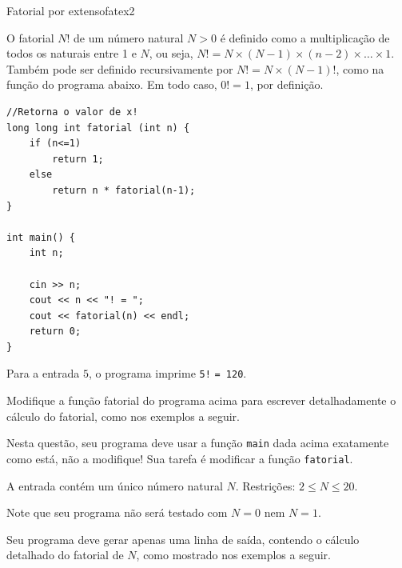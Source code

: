 \documentclass[12pt,a4paper,oneside]{article}
\begin{document}
\begin{problem}{Fatorial por extenso}{fatex}{2}
 
O fatorial $N!$ de um número natural $N > 0$ é definido como a multiplicação de todos os naturais entre 1 e $N$, ou seja, $N!=N \times (N-1) \times (n-2) \times \dots \times 1$. Também pode ser definido recursivamente por $N! = N \times (N-1)!$, como na função do programa abaixo. Em todo caso, $0! = 1$, por definição.

\begin{lstlisting}
//Retorna o valor de x!
long long int fatorial (int n) {
    if (n<=1)
        return 1;
    else
        return n * fatorial(n-1);
}

int main() {
    int n;
    
    cin >> n;
    cout << n << "! = ";
    cout << fatorial(n) << endl;
    return 0;
}

\end{lstlisting}

Para a entrada $5$, o programa imprime \texttt{5!} \texttt{= 120}.

Modifique a função fatorial do programa acima para escrever detalhadamente o cálculo do fatorial, como nos exemplos a seguir.

\Notes

Nesta questão, seu programa deve usar a função \texttt{main} dada acima exatamente como está, não a modifique! Sua tarefa é modificar a função \texttt{fatorial}.


\InputFile

A entrada contém um único número natural $N$. Restrições: $2 \leq N \leq 20$.

Note que seu programa não será testado com $N=0$ nem $N=1$.

\OutputFile

Seu programa deve gerar apenas uma linha de saída, contendo o cálculo detalhado do fatorial de $N$, como mostrado nos exemplos a seguir.

\Example

\setlength\exmpwidinf{6cm}
\setlength\exmpwidouf{10cm}
   

\begin{example}
%
\end{example}

\begin{example}
%
\end{example}


\end{problem}
\end{document}
